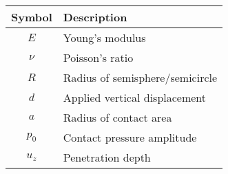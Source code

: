 \renewcommand{\arraystretch}{1.2}
\begin{tabular}{@{}cl@{}}
    \toprule
    Symbol & Description \\
    \midrule
    $E$ & Young's modulus \\
    $\nu$ & Poisson's ratio \\
    $R$ & Radius of semisphere/semicircle \\
    $d$ & Applied vertical displacement \\
    $a$ & Radius of contact area \\
    $p_0$ & Contact pressure amplitude \\
    $u_z$ & Penetration depth \\
    \bottomrule
\end{tabular}
